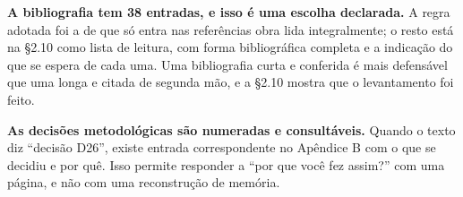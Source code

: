 \textbf{A bibliografia tem 38 entradas, e isso é uma escolha declarada.} A regra
adotada foi a de que só entra nas referências obra lida integralmente; o resto
está na §2.10 como lista de leitura, com forma bibliográfica completa e a
indicação do que se espera de cada uma. Uma bibliografia curta e conferida é
mais defensável que uma longa e citada de segunda mão, e a §2.10 mostra que o
levantamento foi feito.

\textbf{As decisões metodológicas são numeradas e consultáveis.} Quando o texto
diz ``decisão D26'', existe entrada correspondente no Apêndice B com o que se
decidiu e por quê. Isso permite responder a ``por que você fez assim?'' com uma
página, e não com uma reconstrução de memória.
